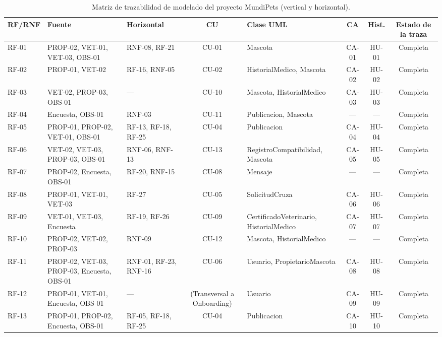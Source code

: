 \documentclass[journal,onecolumn]{IEEEtran}
\begin{document}
\begin{landscape}
	\begin{table}[H]
		\centering
		\caption{Matriz de trazabilidad de modelado del proyecto MundiPets (vertical y horizontal).}
		\label{tab:matriz_modelado}
		\tiny
		\begin{tabularx}{\linewidth}{|l|X|X|c|X|c|c|c|}
			\hline
			\textbf{RF/RNF} & \textbf{Fuente} & \textbf{Horizontal} & \textbf{CU} & \textbf{Clase UML} & \textbf{CA} & \textbf{Hist.} & \textbf{Estado de la traza} \\
			\hline
RF-01 & PROP-02, VET-01, VET-03, OBS-01 & RNF-08, RF-21 & CU-01 & Mascota & CA-01 & HU-01 & Completa \\ \hline
RF-02 & PROP-01, VET-02 & RF-16, RNF-05 & CU-02 & HistorialMedico, Mascota & CA-02 & HU-02 & Completa \\ \hline
RF-03 & VET-02, PROP-03, OBS-01 & --- & CU-10 & Mascota, HistorialMedico & CA-03 & HU-03 & Completa \\ \hline
RF-04 & Encuesta, OBS-01 & RNF-03 & CU-11 & Publicacion, Mascota & --- & --- & Completa \\ \hline
RF-05 & PROP-01, PROP-02, VET-01, OBS-01 & RF-13, RF-18, RF-25 & CU-04 & Publicacion & CA-04 & HU-04 & Completa \\ \hline
RF-06 & VET-02, VET-03, PROP-03, OBS-01 & RNF-06, RNF-13 & CU-13 & RegistroCompatibilidad, Mascota & CA-05 & HU-05 & Completa \\ \hline
RF-07 & PROP-02, Encuesta, OBS-01 & RF-20, RNF-15 & CU-08 & Mensaje & --- & --- & Completa \\ \hline
RF-08 & PROP-01, VET-01, VET-03 & RF-27 & CU-05 & SolicitudCruza & CA-06 & HU-06 & Completa \\ \hline
RF-09 & VET-01, VET-03, Encuesta & RF-19, RF-26 & CU-09 & CertificadoVeterinario, HistorialMedico & CA-07 & HU-07 & Completa \\ \hline
RF-10 & PROP-02, VET-02, PROP-03 & RNF-09 & CU-12 & Mascota, HistorialMedico & --- & --- & Completa \\ \hline
RF-11 & PROP-02, VET-03, PROP-03, Encuesta, OBS-01 & RNF-01, RF-23, RNF-16 & CU-06 & Usuario, PropietarioMascota & CA-08 & HU-08 & Completa \\ \hline
RF-12 & PROP-01, VET-01, Encuesta, OBS-01 & --- & (Transversal a Onboarding) & Usuario & CA-09 & HU-09 & Completa \\ \hline
RF-13 & PROP-01, PROP-02, Encuesta, OBS-01 & RF-05, RF-18, RF-25 & CU-04 & Publicacion & CA-10 & HU-10 & Completa \\ \hline

\end{tabularx}
\end{table}
\end{landscape}
\end{document}
